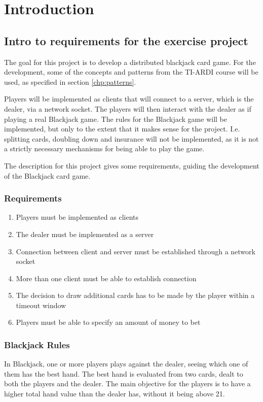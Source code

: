 \chapter{Introduction}
\label{chp:intro}

\section{Intro to requirements for the exercise project}

The goal for this project is to develop a distributed blackjack card game. For the development, some of the concepts and patterns from the TI-ARDI course will be used, as specified in section \ref{chp:patterns}. 

Players will be implemented as clients that will connect to a server, which is the dealer, via a network socket. The players will then interact with the dealer as if playing a real Blackjack game. The rules for the Blackjack game will be implemented, but only to the extent that it makes sense for the project. I.e. splitting cards, doubling down and insurance will not be implemented, as it is not a strictly necessary mechanisms for being able to play the game. 

The description for this project gives some requirements, guiding the development of the Blackjack card game.
\subsection{Requirements}
\begin{enumerate}  
	\item Players must be implemented as clients
	\item The dealer must be implemented as a server
	\item Connection between client and server must be established through a network socket
	\item More than one client must be able to establish connection
	\item The decision to draw additional cards has to be made by the player within a timeout window
	\item Players must be able to specify an amount of money to bet
\end{enumerate}

\subsection{Blackjack Rules}
In Blackjack, one or more players plays against the dealer, seeing which one of them has the best hand. The best hand is evaluated from two cards, dealt to both the players and the dealer. The main objective for the players is to have a higher total hand value than the dealer has, without it being above 21.
 
